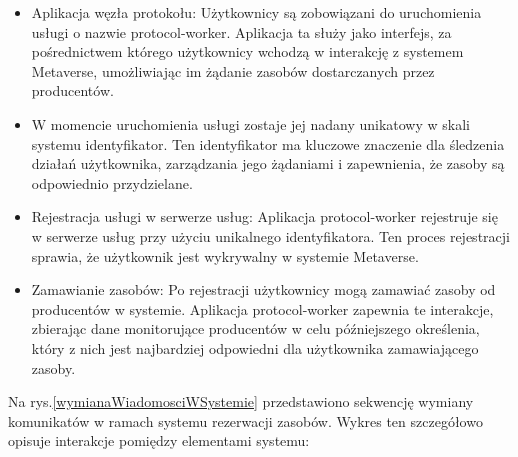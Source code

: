 \begin{itemize}
    \item Aplikacja węzła protokołu: Użytkownicy są zobowiązani do uruchomienia usługi o nazwie protocol-worker. Aplikacja ta służy jako interfejs, za pośrednictwem którego użytkownicy wchodzą w interakcję z systemem Metaverse, umożliwiając im żądanie zasobów dostarczanych przez producentów.
    \item W momencie uruchomienia usługi zostaje jej nadany unikatowy w skali systemu identyfikator. Ten identyfikator ma kluczowe znaczenie dla śledzenia działań użytkownika, zarządzania jego żądaniami i zapewnienia, że zasoby są odpowiednio przydzielane.
    \item Rejestracja usługi w serwerze usług: Aplikacja protocol-worker rejestruje się w serwerze usług przy użyciu unikalnego identyfikatora. Ten proces rejestracji sprawia, że użytkownik jest wykrywalny w systemie Metaverse.
    \item Zamawianie zasobów: Po rejestracji użytkownicy mogą zamawiać zasoby od producentów w systemie. Aplikacja protocol-worker zapewnia te interakcje, zbierając dane monitorujące producentów w celu późniejszego określenia, który z nich jest najbardziej odpowiedni dla użytkownika zamawiającego zasoby.
\end{itemize}

Na rys.\ref{wymianaWiadomosciWSystemie} przedstawiono sekwencję wymiany komunikatów w ramach systemu rezerwacji zasobów. Wykres ten szczegółowo opisuje interakcje pomiędzy elementami systemu:

